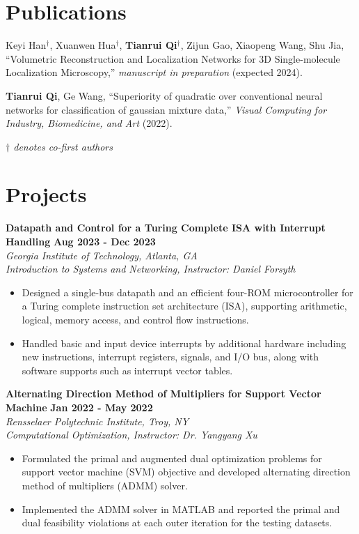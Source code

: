 \documentclass[letterpaper, 11pt]{article}
\newcommand{\subsectionvspace}{\vspace{8pt}}
\begin{document}
\section{Publications}


    Keyi Han$^\dag$, Xuanwen Hua$^\dag$, \textbf{Tianrui Qi}$^\dag$, Zijun Gao, Xiaopeng Wang, Shu Jia, ``Volumetric Reconstruction and Localization Networks for 3D Single-molecule Localization Microscopy,'' \textit{manuscript in preparation} (expected 2024).

    \subsectionvspace

    \textbf{Tianrui Qi}, Ge Wang, ``Superiority of quadratic over conventional neural networks for classification of gaussian mixture data,'' \textit{Visual Computing for Industry, Biomedicine, and Art} (2022).

    \subsectionvspace

    \textit{$\dag$ denotes co-first authors}


\section{Projects}


    \textbf{Datapath and Control for a Turing Complete ISA with Interrupt Handling} \hfill
    \textbf{Aug 2023 - Dec 2023} \\
    \textit{Georgia Institute of Technology, Atlanta, GA} \\
    \textit{Introduction to Systems and Networking, Instructor: Daniel Forsyth}
    \begin{itemize}
        \item Designed a single-bus datapath and an efficient four-ROM microcontroller for a Turing complete instruction set architecture (ISA), supporting arithmetic, logical, memory access, and control flow instructions.
        \item Handled basic and input device interrupts by additional hardware including new instructions, interrupt registers, signals, and I/O bus, along with software supports such as interrupt vector tables.
    \end{itemize}

    \subsectionvspace

    \textbf{Alternating Direction Method of Multipliers for Support Vector Machine} \hfill 
    \textbf{Jan 2022 - May 2022} \\
    \textit{Rensselaer Polytechnic Institute, Troy, NY} \\
    \textit{Computational Optimization, Instructor: Dr. Yangyang Xu}
    \begin{itemize}
        \item Formulated the primal and augmented dual optimization problems for support vector machine (SVM) objective and developed alternating direction method of multipliers (ADMM) solver.
        \item Implemented the ADMM solver in MATLAB and reported the primal and dual feasibility violations at each outer iteration for the testing datasets.
    \end{itemize}
\end{document}
